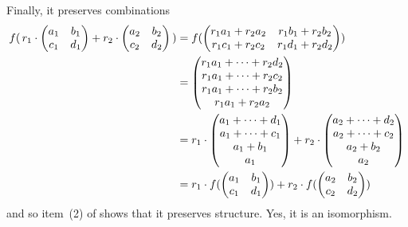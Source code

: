 \begin{exercises}
\begin{answer}
\begin{exparts}
        Finally, it preserves combinations
        \begin{align*}
          f(\,r_1\cdot\begin{pmatrix}
              a_1  &b_1  \\
              c_1  &d_1
            \end{pmatrix}
            +r_2\cdot\begin{pmatrix}
              a_2  &b_2  \\
              c_2  &d_2
            \end{pmatrix}\,)
          &=f(\begin{pmatrix}
              r_1a_1+r_2a_2  &r_1b_1+r_2b_2  \\
              r_1c_1+r_2c_2  &r_1d_1+r_2d_2
            \end{pmatrix})                            \\
          &=\begin{pmatrix} r_1a_1+\dots+r_2d_2 \\ r_1a_1+\dots+r_2c_2 \\ 
                       r_1a_1+\dots+r_2b_2 \\ r_1a_1+r_2a_2 \end{pmatrix}          \\
          &=r_1\cdot\begin{pmatrix} a_1+\dots+d_1 \\ a_1+\dots+c_1 \\ 
                       a_1+b_1 \\ a_1 \end{pmatrix}
          +r_2\cdot\begin{pmatrix} a_2+\dots+d_2 \\ a_2+\dots+c_2 \\ 
                       a_2+b_2 \\ a_2 \end{pmatrix}                         \\
          &=r_1\cdot f(\begin{pmatrix}
                  a_1  &b_1  \\
                  c_1  &d_1
            \end{pmatrix})
          +r_2\cdot f(\begin{pmatrix}
                  a_2  &b_2  \\
                  c_2  &d_2
            \end{pmatrix})
        \end{align*}
        and so item~(2) of  shows that
        it preserves structure. 
      \partsitem Yes, it is an isomorphism.


\end{exparts}
\end{answer}
\end{exercises}
